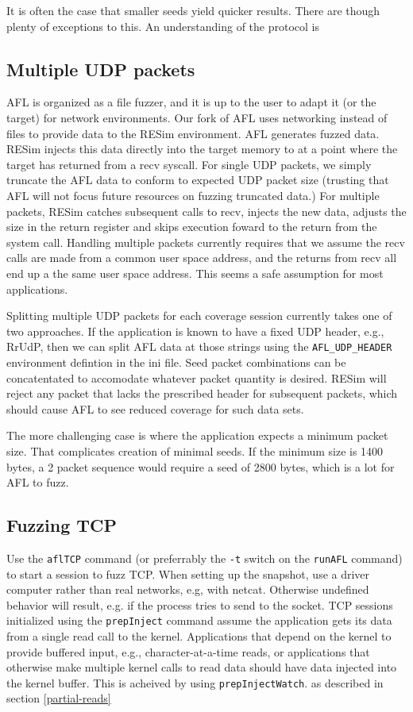 \documentclass[titlepage]{article}
\begin{document}
It is often the case that smaller seeds yield quicker results.  There are though plenty of exceptions to this.  An understanding of the protocol is 

\subsection{Multiple UDP packets}
AFL is organized as a file fuzzer, and it is up to the user to adapt it (or the target) for network environments.
Our fork of AFL uses networking instead of files to provide data to the RESim environment.
AFL generates fuzzed data.  RESim injects this data directly into the target memory to at a point where the target has returned from a recv syscall.
For single UDP packets, we simply truncate the AFL data to conform to expected UDP packet size (trusting that AFL will not focus future resources on fuzzing 
truncated data.)    For multiple packets, RESim catches subsequent calls to recv, injects the new data, adjusts the size in the
return register and skips execution foward to the return from the system call.
Handling multiple packets currently requires that we assume the recv calls are made from a common user space address, and
the returns from recv all end up a the same user space address.  This seems a safe assumption for most applications.  

Splitting multiple UDP packets for each coverage session currently takes one of two approaches.  If the application is known
to have a fixed UDP header, e.g., RrUdP, then we can split AFL data at those strings using the {\tt AFL\_UDP\_HEADER} environment
defintion in the ini file.  Seed packet combinations can be concatentated
to accomodate whatever packet quantity is desired.  RESim will reject any packet that lacks the prescribed header for subsequent
packets, which should cause AFL
to see reduced coverage for such data sets.

The more challenging case is where the application expects a minimum packet size.  That complicates creation of minimal seeds.  If the
minimum size is 1400 bytes, a 2 packet sequence would require a seed of 2800 bytes, which is a lot for AFL to fuzz.

\subsection{Fuzzing TCP}
Use the {\tt aflTCP} command (or preferrably the {\tt -t} switch on the {\tt runAFL} command) to start a session to fuzz TCP.  
When setting up the snapshot, use a driver computer rather than
real networks, e.g, with netcat.  Otherwise undefined behavior will result, e.g. if the process tries to send to the socket.
TCP sessions initialized using the {\tt prepInject} command assume the application gets its data from a single read call to the kernel.
Applications that depend on the kernel to provide buffered input, e.g., character-at-a-time reads, or applications that otherwise make multiple
kernel calls to read data should have data injected into the kernel buffer.  This is acheived by using {\tt prepInjectWatch}. 
as described in section \ref{partial-reads} 
\end{document}
